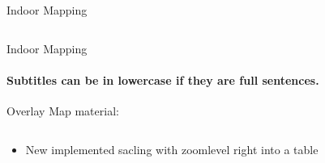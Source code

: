 \documentclass[11pt]{beamer}
\begin{document}
\begin{frame}{Indoor Mapping}
\begin{columns}[T]
\begin{column}{.4\textwidth}
  \end{column}
\end{columns}

\end{frame}


\begin{frame}{Indoor Mapping}

\framesubtitle{Subtitles can be in lowercase if they are full sentences.}
Overlay Map material:

  \begin{columns}[T]
  \begin{column}{.6\textwidth}
  \begin{itemize}
    \item New implemented sacling with zoomlevel right into a table
  \end{itemize}
  \end{column}
  \begin{column}{.4\textwidth}

\end{column}
\end{columns}
\end{frame}
\end{document}
